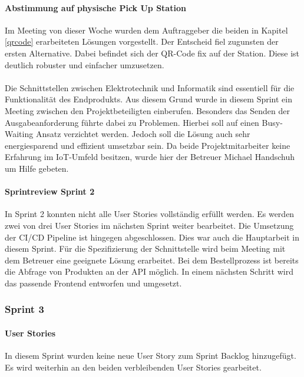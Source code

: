 \paragraph{Abstimmung auf physische Pick Up Station}\label{abstimmungPickUp}
Im Meeting von dieser Woche wurden dem Auftraggeber die beiden in Kapitel \ref{qrcode} erarbeiteten Lösungen vorgestellt. Der Entscheid fiel zugunsten der ersten Alternative. Dabei befindet sich der QR-Code fix auf der Station. Diese ist deutlich robuster und einfacher umzusetzen. \\\\
Die Schnittstellen zwischen Elektrotechnik und Informatik sind essentiell für die Funktionalität des Endprodukts. Aus diesem Grund wurde in diesem Sprint ein Meeting zwischen den Projektbeteiligten einberufen. Besonders das Senden der Ausgabeanforderung führte dabei zu Problemen. Hierbei soll auf einen Busy-Waiting Ansatz verzichtet werden. Jedoch soll die Lösung auch sehr energiesparend und effizient umsetzbar sein. Da beide Projektmitarbeiter keine Erfahrung im \ac{IoT}-Umfeld besitzen, wurde hier der Betreuer Michael Handschuh um Hilfe gebeten. 

\paragraph{Sprintreview Sprint 2}
In Sprint 2 konnten nicht alle User Stories vollständig erfüllt werden. Es werden zwei von drei User Stories im nächsten Sprint weiter bearbeitet. Die Umsetzung der CI/CD Pipeline ist hingegen abgeschlossen. Dies war auch die Hauptarbeit in diesem Sprint. Für die Spezifizierung der Schnittstelle wird beim Meeting mit dem Betreuer eine geeignete Lösung erarbeitet. Bei dem Bestellprozess ist bereits die Abfrage von Produkten an der API möglich. In einem nächsten Schritt wird das passende Frontend entworfen und umgesetzt. 

\subsubsection{Sprint 3}
\paragraph{User Stories}
In diesem Sprint wurden keine neue \gls{User Story} zum Sprint Backlog hinzugefügt. Es wird weiterhin an den beiden verbleibenden User Stories gearbeitet. 

